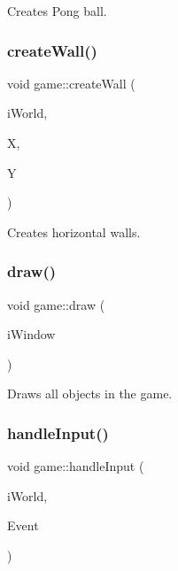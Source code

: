 Creates Pong ball. 

\mbox{\label{classgame_ae6f0753388b6ac52a3efd7073fc55934}} 
\subsubsection{\texorpdfstring{create\+Wall()}{createWall()}}
{\footnotesize\ttfamily void game\+::create\+Wall (\begin{DoxyParamCaption}\item[{b2\+World \&}]{i\+World,  }\item[{float}]{X,  }\item[{float}]{Y }\end{DoxyParamCaption})}



Creates horizontal walls. 

\mbox{\label{classgame_a7d9e3663af2341b48d6de562554f47b1}} 
\subsubsection{\texorpdfstring{draw()}{draw()}}
{\footnotesize\ttfamily void game\+::draw (\begin{DoxyParamCaption}\item[{sf\+::\+Render\+Window \&}]{i\+Window }\end{DoxyParamCaption})\hspace{0.3cm}{\ttfamily [virtual]}}



Draws all objects in the game. 

\mbox{\label{classgame_a9733b814ab29dd4407441c17fa58b187}} 
\subsubsection{\texorpdfstring{handle\+Input()}{handleInput()}}
{\footnotesize\ttfamily void game\+::handle\+Input (\begin{DoxyParamCaption}\item[{b2\+World \&}]{i\+World,  }\item[{sf\+::\+Event \&}]{Event }\end{DoxyParamCaption})\hspace{0.3cm}{\ttfamily [virtual]}}




